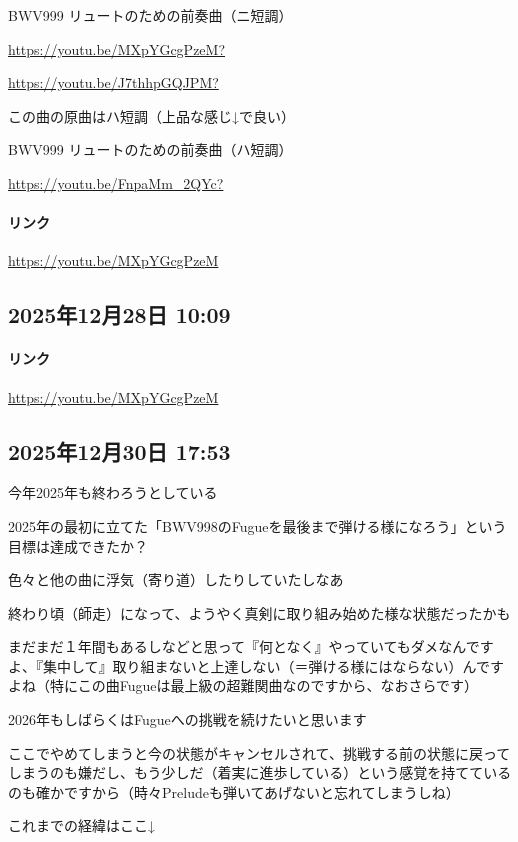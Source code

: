 BWV999 リュートのための前奏曲（ニ短調）

\url{https://youtu.be/MXpYGcgPzeM?}

\url{https://youtu.be/J7thhpGQJPM?}

この曲の原曲はハ短調（上品な感じ↓で良い）

BWV999 リュートのための前奏曲（ハ短調）

\url{https://youtu.be/FnpaMm_2QYc?}

\paragraph{リンク}
\url{https://youtu.be/MXpYGcgPzeM}

\subsection*{2025年12月28日 10:09}

\paragraph{リンク}
\url{https://youtu.be/MXpYGcgPzeM}

\subsection*{2025年12月30日 17:53}

今年2025年も終わろうとしている

2025年の最初に立てた「BWV998のFugueを最後まで弾ける様になろう」という目標は達成できたか？

色々と他の曲に浮気（寄り道）したりしていたしなあ

終わり頃（師走）になって、ようやく真剣に取り組み始めた様な状態だったかも

まだまだ１年間もあるしなどと思って『何となく』やっていてもダメなんですよ、『集中して』取り組まないと上達しない（＝弾ける様にはならない）んですよね（特にこの曲Fugueは最上級の超難関曲なのですから、なおさらです）

2026年もしばらくはFugueへの挑戦を続けたいと思います

ここでやめてしまうと今の状態がキャンセルされて、挑戦する前の状態に戻ってしまうのも嫌だし、もう少しだ（着実に進歩している）という感覚を持てているのも確かですから（時々Preludeも弾いてあげないと忘れてしまうしね）

これまでの経緯はここ↓

